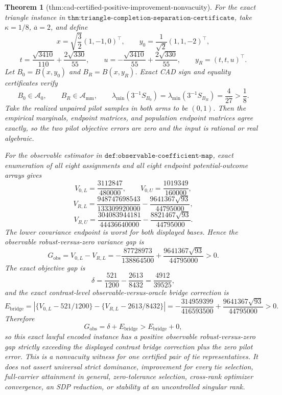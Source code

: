 \documentclass{article}
\newtheorem{theorem}{Theorem}
\begin{document}
\begin{theorem}[thm:cad-certified-positive-improvement-nonvacuity]\label{thm:cad-certified-positive-improvement-nonvacuity}
For the exact triangle instance in \(\texttt{thm:triangle-completion-separation-certificate}\), take \(\kappa=1/8\), \(\overline a=2\), and define
\[
x=\sqrt{\frac32}(1,-1,0)^{\top},
\qquad
y_0=\frac1{\sqrt2}(1,1,-2)^{\top},
\]
\[
t=\frac{\sqrt{3410}}{110}+\frac{2\sqrt{330}}{55},
\qquad
u=-\frac{\sqrt{3410}}{55}+\frac{2\sqrt{330}}{55},
\qquad
y_R=(t,t,u)^{\top}.
\]
Let \(B_0=B(x,y_0)\) and \(B_R=B(x,y_R)\).  Exact CAD sign and equality certificates verify
\[
B_0\in\mathcal A_0,
\qquad
B_R\in\mathcal A_{\mathrm{mm}},
\qquad
\lambda_{\min}(3^{-1}S_{B_0})
=\lambda_{\min}(3^{-1}S_{B_R})=\frac4{27}>\frac18.
\]
Take the realized unpaired pilot samples in both arms to be \((0,1)\).  Then the empirical marginals, endpoint matrices, and population endpoint matrices agree exactly, so the two pilot objective errors are zero and the input is rational or real algebraic.

For the observable estimator in \(\texttt{def:observable-coefficient-map}\), exact enumeration of all eight assignments and all eight endpoint potential-outcome arrays gives
\[
V_{0,L}=\frac{3112847}{480000},
\qquad
V_{0,U}=\frac{1019349}{160000},
\]
\[
V_{R,L}
=\frac{948747698543}{133309920000}
-\frac{9641367\sqrt{93}}{44795000},
\]
\[
V_{R,U}
=\frac{304083944181}{44436640000}
-\frac{8821467\sqrt{93}}{44795000}.
\]
The lower covariance endpoint is worst for both displayed bases.  Hence the observable robust-versus-zero variance gap is
\[
G_{\mathrm{obs}}
=V_{0,L}-V_{R,L}
=-\frac{87728973}{138864500}
+\frac{9641367\sqrt{93}}{44795000}>0.
\]
The exact objective gap is
\[
\delta=\frac{521}{1200}-\frac{2613}{8432}
=\frac{4912}{39525},
\]
and the exact contrast-level observable-versus-oracle bridge correction is
\[
E_{\mathrm{bridge}}
=\left|
\{V_{0,L}-521/1200\}
-\{V_{R,L}-2613/8432\}
\right|
=-\frac{314959399}{416593500}
+\frac{9641367\sqrt{93}}{44795000}>0.
\]
Therefore
\[
G_{\mathrm{obs}}
=\delta+E_{\mathrm{bridge}}
>E_{\mathrm{bridge}}+0,
\]
so this exact lawful encoded instance has a positive observable robust-versus-zero gap strictly exceeding the displayed contrast bridge correction plus the zero pilot error.  This is a nonvacuity witness for one certified pair of tie representatives.  It does not assert universal strict dominance, improvement for every tie selection, full-carrier attainment in general, zero-tolerance selection, cross-rank optimizer convergence, an SDP reduction, or stability at an uncontrolled singular rank.
\end{theorem}
\end{document}
